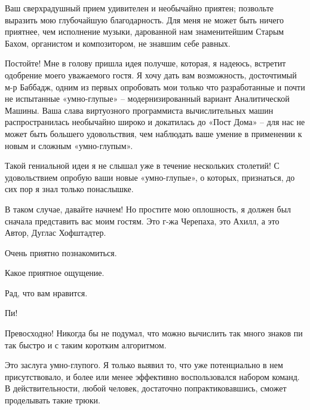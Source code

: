 \documentclass[../main.tex]{subfiles}
\begin{document}
\begin{dialogue}
 Ваш сверхрадушный прием удивителен и необычайно приятен; позвольте выразить мою глубочайшую благодарность. Для меня не может быть ничего приятнее, чем исполнение музыки, дарованной нам знаменитейшим Старым Бахом, органистом и композитором, не знавшим себе равных.

 Постойте! Мне в голову пришла идея получше, которая, я надеюсь, встретит одобрение моего уважаемого гостя. Я хочу дать вам возможность, досточтимый м-р Баббадж, одним из первых опробовать мои только что разработанные и почти не испытанные «умно-глупые» \--- модернизированный вариант Аналитической Машины. Ваша слава виртуозного программиста вычислительных машин распространилась необычайно широко и докатилась до «Пост Дома» \--- для нас не может быть большего удовольствия, чем наблюдать ваше умение в применении к новым и сложным «умно-глупым».

 Такой гениальной идеи я не слышал уже в течение нескольких столетий! С удовольствием опробую ваши новые «умно-глупые», о которых, признаться, до сих пор я знал только понаслышке.

 В таком случае, давайте начнем! Но простите мою оплошность, я должен был сначала представить вас моим гостям. Это г-жа Черепаха, это Ахилл, а это Автор, Дуглас Хофштадтер.

 Очень приятно познакомиться.


Какое приятное ощущение.

 Рад, что вам нравится.


 Пи!

 Превосходно! Никогда бы не подумал, что можно вычислить так много знаков пи так быстро и с таким коротким алгоритмом.

 Это заслуга умно-глупого. Я только выявил то, что уже потенциально в нем присутствовало, и более или менее эффективно воспользовался набором команд. В действительности, любой человек, достаточно попрактиковавшись, сможет проделывать такие трюки.


\end{dialogue}
\end{document}
